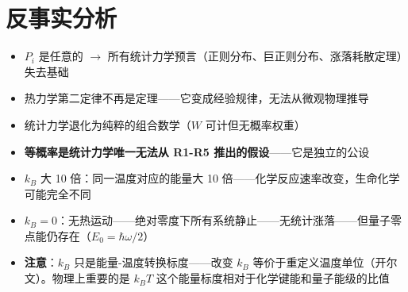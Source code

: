 \section*{反事实分析}

\begin{limitbox}[若无等概率先验假设]
  \begin{itemize}
    \item $P_i$ 是任意的 $\to$ 所有统计力学预言（正则分布、巨正则分布、涨落耗散定理）失去基础
    \item 热力学第二定律不再是定理——它变成经验规律，无法从微观物理推导
    \item 统计力学退化为纯粹的组合数学（$W$ 可计但无概率权重）
    \item \textbf{等概率是统计力学唯一无法从 R1-R5 推出的假设}——它是独立的公设
  \end{itemize}
\end{limitbox}

\begin{limitbox}[若 $k_B$ 的值不同]
  \begin{itemize}
    \item $k_B$ 大 10 倍：同一温度对应的能量大 10 倍——化学反应速率改变，生命化学可能完全不同
    \item $k_B = 0$：无热运动——绝对零度下所有系统静止——无统计涨落——但量子零点能仍存在（$E_0 = \hbar\omega/2$）
    \item \textbf{注意}：$k_B$ 只是能量-温度转换标度——改变 $k_B$ 等价于重定义温度单位（开尔文）。物理上重要的是 $k_B T$ 这个能量标度相对于化学键能和量子能级的比值
  \end{itemize}
\end{limitbox}
